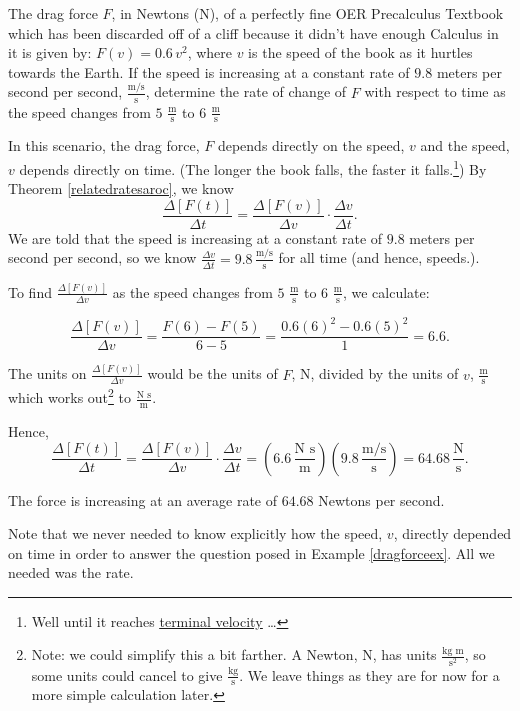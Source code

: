 \documentclass{ximera}
\begin{document}
\begin{example}\label{dragforceex} The drag force $F$, in Newtons (N), of a perfectly fine OER Precalculus Textbook which has been discarded off of a cliff because it didn't have enough Calculus in it is given by:  $F(v) = 0.6 \, v^2$, where $v$ is the speed of the book as it hurtles towards the Earth. If the speed is increasing at a constant rate of $9.8$ meters per second per second, $\frac{\text{m/s}}{\text{s}}$, determine the rate of change of $F$ with respect to time as the speed changes from $5$ $\frac{\text{m}}{\text{s}}$ to $6$ $\frac{\text{m}}{\text{s}}$

\begin{explanation} In this scenario, the drag force, $F$ depends directly on the speed, $v$ and the speed, $v$ depends directly on time.  (The longer the book falls, the faster it falls.\footnote{Well until it reaches \href{https://en.wikipedia.org/wiki/Terminal_velocity}{\underline{terminal velocity}} \ldots})  By Theorem \ref{relatedratesaroc}, we know \[ \frac{\Delta[F(t)]}{\Delta t} = \frac{\Delta[F(v)]}{\Delta v} \cdot \frac{\Delta v}{\Delta t}.\]
We are told that the speed is increasing at a constant rate of $9.8$ meters per second per second, so we know $\frac{\Delta v}{\Delta t} = 9.8 \, \frac{\text{m/s}}{\text{s}}$ for all time (and hence, speeds.). 

To find $\frac{\Delta[F(v)]}{\Delta v}$ as the speed changes from $5$ $\frac{\text{m}}{\text{s}}$ to $6$ $\frac{\text{m}}{\text{s}}$, we calculate:

\[ \frac{\Delta[F(v)]}{\Delta v} = \frac{F(6) - F(5)}{6-5} = \frac{0.6 (6)^2 - 0.6 (5)^2}{1} = 6.6.\]

The units on $\frac{\Delta[F(v)]}{\Delta v}$ would be the units of $F$, N, divided by the units of $v$, $\frac{\text{m}}{\text{s}}$ which works out\footnote{Note:  we could simplify this a bit farther.  A Newton, N, has units $\frac{\text{kg m}}{\text{s}^2}$, so some units could cancel  to give   $\frac{\text{kg}}{\text{s}}$.  We leave things as they are for now for a more simple calculation later.} to $\frac{\text{N s}}{\text{m}}$. 

Hence, \[ \frac{\Delta[F(t)]}{\Delta t} =  \frac{\Delta[F(v)]}{\Delta v} \cdot \frac{\Delta v}{\Delta t} = \left(6.6 \,  \frac{\text{N s}}{\text{m}} \right) \left( 9.8  \, \frac{\text{m/s}}{\text{s}} \right) = 64.68 \, \frac{\text{N}}{\text{s}} .\]

The force is increasing at an average rate of $64.68$ Newtons per second.

\end{explanation}
\end{example}

Note that we never needed to know explicitly how the speed, $v$, directly depended on time in order to answer the question posed in Example \ref{dragforceex}. All we needed was the rate.  



\closegraphsfile
\end{document}
